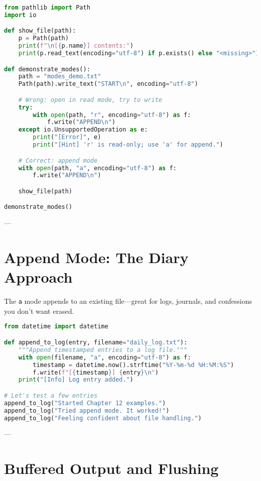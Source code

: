 \begin{lstlisting}[language=Python, caption={Example 3: Trying wrong modes, then fixing them.}]
from pathlib import Path
import io

def show_file(path):
    p = Path(path)
    print(f"\n[{p.name}] contents:")
    print(p.read_text(encoding="utf-8") if p.exists() else "<missing>")

def demonstrate_modes():
    path = "modes_demo.txt"
    Path(path).write_text("START\n", encoding="utf-8")

    # Wrong: open in read mode, try to write
    try:
        with open(path, "r", encoding="utf-8") as f:
            f.write("APPEND\n")
    except io.UnsupportedOperation as e:
        print("[Error]", e)
        print("[Hint] 'r' is read-only; use 'a' for append.")

    # Correct: append mode
    with open(path, "a", encoding="utf-8") as f:
        f.write("APPEND\n")

    show_file(path)

demonstrate_modes()
\end{lstlisting}

---

\section{Append Mode: The Diary Approach}

The \texttt{a} mode appends to an existing file—great for logs, journals, and confessions you don’t want erased.

\begin{lstlisting}[language=Python, caption={Example 4: Appending to a file repeatedly.}]
from datetime import datetime

def append_to_log(entry, filename="daily_log.txt"):
    """Append timestamped entries to a log file."""
    with open(filename, "a", encoding="utf-8") as f:
        timestamp = datetime.now().strftime("%Y-%m-%d %H:%M:%S")
        f.write(f"[{timestamp}] {entry}\n")
    print("[Info] Log entry added.")

# Let's test a few entries
append_to_log("Started Chapter 12 examples.")
append_to_log("Tried append mode. It worked!")
append_to_log("Feeling confident about file handling.")
\end{lstlisting}

---

\section{Buffered Output and Flushing}

